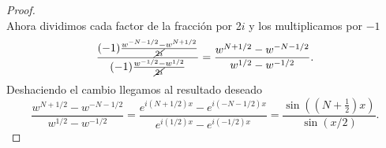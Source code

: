 \documentclass[12pt]{article}
\theoremstyle{plain}
\theoremstyle{definition}
\numberwithin{equation}{section}
\begin{document}
\begin{proof}
\begin{equation*}
            \end{equation*}
            Ahora dividimos cada factor de la fracción por 2\(i\) y los multiplicamos por \(-1\)
            \begin{equation*}
                \frac{(-1) \frac{w^{-N-1/2} - w^{N+1/2}}{\cancel{2i}}}{(-1)\frac{w^{-1/2}-w^{1/2}}{\cancel{2i}}} = \frac{w^{N+1/2} - w^{-N-1/2}}{w^{1/2} - w^{-1/2}}.
            \end{equation*}
            Deshaciendo el cambio llegamos al resultado deseado
            \begin{equation*}
                \frac{w^{N+1/2} - w^{-N-1/2}}{w^{1/2} - w^{-1/2}} = \frac{e^{i(N+1/2)x} - e^{i(-N-1/2)x}}{e^{i(1/2)x} - e^{i(-1/2)x}} = \frac{\sin((N+\frac{1}{2})x)}{\sin (x/2)}.
            \end{equation*}
        \end{proof}
\end{document}
